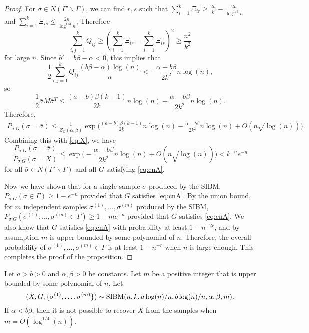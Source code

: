 \documentclass{article}
\begin{document}
\begin{proof}
For $\bar{\sigma}\in N(\Gamma' \backslash \Gamma)$, we can find $r,s$ such that
$\sum_{i=1}^k \Xi_{ir} \geq \frac{2n}{k} - \frac{2n}{\log^{1/3} n }$ and 
$\sum_{i=1}^k \Xi_{is} \leq \frac{2n}{\log^{1/3} n }$, Therefore
$$
\sum_{i,j=1}^k Q_{ij} \geq (\sum_{i=1}^k \Xi_{ir} - \sum_{i=1}^k \Xi_{is})^2 \geq \frac{n^2}{k^2}
$$
for large $n$. Since $b' = b\beta-\alpha<0$, this implies that
$$
\frac{1}{2}\sum_{i,j=1}^k Q_{ij}
\frac{(b\beta-\alpha)\log(n)}{n}
< - \frac{\alpha-b\beta}{2k^2} n\log(n) ,
$$
so
$$
\frac{1}{2}\bar{\sigma} M \bar{\sigma}^T  
\le \frac{(a-b)\beta(k-1)}{2k}n\log(n)
- \frac{\alpha-b\beta}{2k^2} n\log(n) .
$$
Therefore,
\begin{align*}
P_{\sigma|G}(\sigma=\bar{\sigma}) \le \frac{1}{Z_G(\alpha,\beta)}
\exp\Big(\frac{(a-b)\beta(k-1)}{2k}n\log(n) 
-\frac{\alpha-b\beta}{2k^2} n\log(n)
+ O(n\sqrt{\log(n)}) \Big) .
\end{align*}
Combining this with \eqref{eq:X}, we have
$$
\frac{P_{\sigma|G}(\sigma=\bar{\sigma})}{P_{\sigma|G}(\sigma=X)}
\le \exp\Big(-\frac{\alpha-b\beta}{2k^2} n\log(n)
+ O(n\sqrt{\log(n)}) \Big)
<k^{-n} e^{-n}
$$
for all $\bar{\sigma}\in N(\Gamma' \backslash \Gamma)$ and all $G$ satisfying \eqref{eq:cnA}.

Now we have shown that for a single sample $\sigma$ produced by the SIBM, $P_{\sigma|G}(\sigma\in\Gamma)\ge 1- e^{-n}$ provided that $G$ satisfies \eqref{eq:cnA}. By the union bound, for $m$ independent samples $\sigma^{(1)},\dots,\sigma^{(m)}$ produced by the SIBM, $P_{\sigma|G}(\sigma^{(1)},\dots,\sigma^{(m)}\in\Gamma)\ge 1- m e^{-n}$ provided that $G$ satisfies \eqref{eq:cnA}.
We also know that $G$ satisfies \eqref{eq:cnA} with probability at least $1-n^{-2r}$, and by assumption $m$ is upper bounded by some polynomial of $n$. Therefore, the overall probability of $\sigma^{(1)},\dots,\sigma^{(m)}\in\Gamma$ is at least $1-n^{-r}$ when $n$ is large enough. This completes the proof of the proposition.
\end{proof}
\begin{proposition}  \label{prop:ab}
Let $a>b>0$ and $\alpha,\beta>0$ be constants. Let $m$ be a positive integer that is upper bounded by some polynomial of $n$.
Let 
$$
(X,G,\{\sigma^{(1)},\dots,\sigma^{(m)}\})\sim \operatorname{SIBM}(n,k, a\log(n)/n, b\log(n)/n,\alpha,\beta, m) .
$$
If $\alpha<b\beta$, then it is not possible to recover $X$ from the samples when $m=O(\log^{1/4}(n))$.
\end{proposition}
\end{document}

